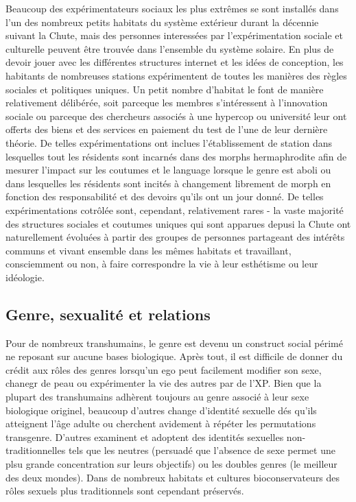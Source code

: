 Beaucoup des expérimentateurs sociaux les plus extrêmes se sont installés dans l'un des nombreux petits habitats du système extérieur durant la décennie suivant la Chute, mais des personnes interessées par l'expérimentation sociale et culturelle peuvent être trouvée dans l'ensemble du système solaire. En plus de devoir jouer avec les différentes structures internet et les idées de conception, les habitants de nombreuses stations expérimentent de toutes les manières des règles sociales et politiques uniques. Un petit nombre d'habitat le font de manière relativement délibérée, soit parceque les membres s'intéressent à l'innovation sociale ou parceque des chercheurs associés à une hypercop ou université leur ont offerts des biens et des services en paiement du test de l'une de leur dernière théorie. De telles expérimentations ont inclues l'établissement de station dans lesquelles tout les résidents sont incarnés dans des morphs hermaphrodite afin de mesurer l'impact sur les coutumes et le language lorsque le genre est aboli ou dans lesquelles les résidents sont incités à changement librement de morph en fonction des responsabilité et des devoirs qu'ils ont un jour donné. De telles expérimentations cotrôlée sont, cependant, relativement rares - la vaste majorité des structures sociales et coutumes uniques qui sont apparues depusi la Chute ont naturellement évoluées à partir des groupes de personnes partageant des intérêts communs et vivant ensemble dans les mêmes habitats et travaillant, consciemment ou non, à faire correspondre la vie à leur esthétisme ou leur idéologie. 

\subsection{Genre, sexualité et relations} \label{sec:gend-sexu-relat} 

Pour de nombreux transhumains, le genre est devenu un construct social périmé ne reposant sur aucune bases biologique. Après tout, il est difficile de donner du crédit aux rôles des genres lorsqu'un ego peut facilement modifier son sexe, chanegr de peau ou expérimenter la vie des autres par de l'XP. Bien que la plupart des transhumains adhèrent toujours au genre associé à leur sexe biologique originel, beaucoup d'autres change d'identité sexuelle dés qu'ils atteignent l'âge adulte ou cherchent avidement à répéter les permutations transgenre. D'autres examinent et adoptent des identités sexuelles non-traditionnelles tels que les neutres (persuadé que l'absence de sexe permet une plsu grande concentration sur leurs objectifs) ou les doubles genres (le meilleur des deux mondes). Dans de nombreux habitats et cultures bioconservateurs des rôles sexuels plus traditionnels sont cependant préservés. 

